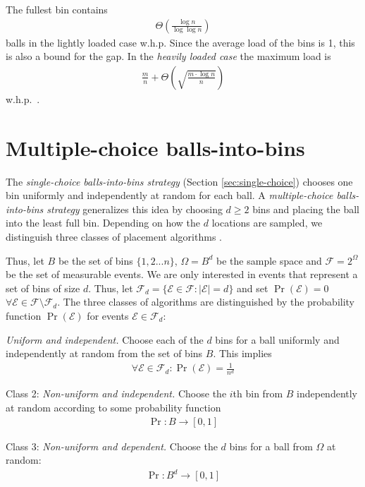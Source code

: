 \documentclass[a4paper,12pt]{article}
\newcommand\todo[1]{\textcolor{red}{(#1)}}
\begin{document}
The fullest bin contains
\begin{align}
\Theta \left( \frac{\log n}{\log \log n} \right)
\end{align} 
balls in the lightly loaded case w.h.p. Since the average load of the bins is 1, this is also a bound for the gap. 
In the \emph{heavily loaded case} the maximum load is 
\begin{align}
\frac{m}{n} + \Theta\left(\sqrt{\frac{m \cdot \log n}{n}}\right)
\end{align} 
w.h.p.~\cite{RS98}.

\section{Multiple-choice balls-into-bins}
\label{sec:multiple-choice}
The \emph{single-choice balls-into-bins strategy} (Section \ref{sec:single-choice}) chooses one bin uniformly and independently at random for each ball. A \emph{multiple-choice balls-into-bins strategy} generalizes this idea by  choosing $d \geq 2$ bins and placing the ball into the least full bin. Depending on how the $d$ locations are sampled, we distinguish three classes of placement algorithms \cite{VOC03}. 

Thus, let $B$ be the set of bins $\{1,2...n\}$, $\Omega = B^{d}$ be the sample space and $\mathcal{F} = 2^{\Omega}$ be the set of measurable events. We are only interested in events that represent a set of bins of size $d$. Thus, let $\mathcal{F}_d = \{\mathcal{E} \in \mathcal{F}: \left\vert \mathcal{E} \right\vert = d\}$ and set $\Pr\left(\mathcal{E}  \right) = 0$  $\forall \mathcal{E} \in \mathcal{F} \setminus \mathcal{F}_d $. The three classes of algorithms are distinguished by the probability function $\Pr\left(\mathcal{E}\right)$ for events $\mathcal{E} \in \mathcal{F}_d$:
\begin{compactitem}
\item  \emph{Uniform and independent.} Choose each of the $d$ bins for a ball uniformly and independently at random from the set of bins $B$. This implies 
\begin{align}
\forall \mathcal{E} \in \mathcal{F}_d: \Pr\left(\mathcal{E}\right) = \frac{1}{n ^{d}}
\end{align}
\item Class 2: \emph{Non-uniform and independent.} Choose the $i$th bin from $B$ independently at random according to some probability function
\begin{align}
\Pr: B \rightarrow \left[0,1\right]
\end{align}

\item Class 3: \emph{Non-uniform and dependent.} Choose the $d$ bins for a ball from $\Omega$ at random:
\begin{align}
\Pr: B^{d} \rightarrow \left[0,1\right]
\end{align}
\end{compactitem} 
 
\end{document}
